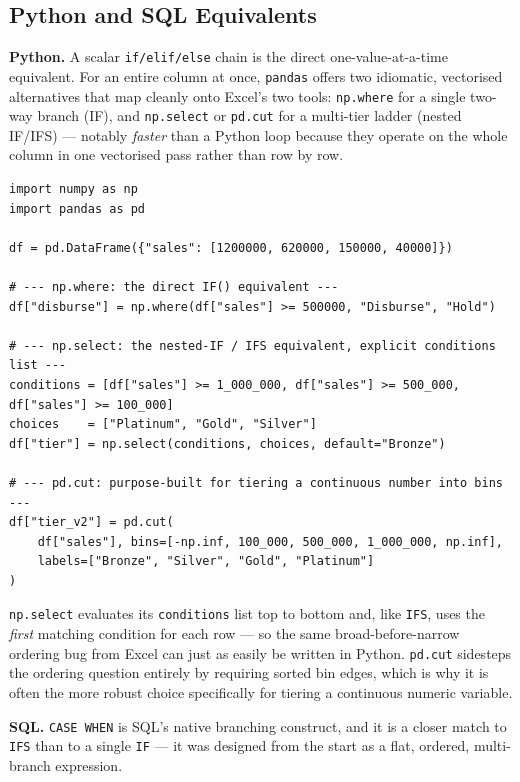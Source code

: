 \documentclass[11pt,a4paper]{article}
\begin{document}
\subsection{Python and SQL Equivalents}

\textbf{Python.} A scalar \texttt{if/elif/else} chain is the direct one-value-at-a-time equivalent. For an entire column at once, \texttt{pandas} offers two idiomatic, vectorised alternatives that map cleanly onto Excel's two tools: \texttt{np.where} for a single two-way branch (IF), and \texttt{np.select} or \texttt{pd.cut} for a multi-tier ladder (nested IF/IFS) --- notably \emph{faster} than a Python loop because they operate on the whole column in one vectorised pass rather than row by row.

\begin{lstlisting}[style=pythonstyle, caption={IF and the tiered bonus schedule, three Python ways}]
import numpy as np
import pandas as pd

df = pd.DataFrame({"sales": [1200000, 620000, 150000, 40000]})

# --- np.where: the direct IF() equivalent ---
df["disburse"] = np.where(df["sales"] >= 500000, "Disburse", "Hold")

# --- np.select: the nested-IF / IFS equivalent, explicit conditions list ---
conditions = [df["sales"] >= 1_000_000, df["sales"] >= 500_000, df["sales"] >= 100_000]
choices    = ["Platinum", "Gold", "Silver"]
df["tier"] = np.select(conditions, choices, default="Bronze")

# --- pd.cut: purpose-built for tiering a continuous number into bins ---
df["tier_v2"] = pd.cut(
    df["sales"], bins=[-np.inf, 100_000, 500_000, 1_000_000, np.inf],
    labels=["Bronze", "Silver", "Gold", "Platinum"]
)
\end{lstlisting}

\begin{protip}
\texttt{np.select} evaluates its \texttt{conditions} list top to bottom and, like \texttt{IFS}, uses the \emph{first} matching condition for each row --- so the same broad-before-narrow ordering bug from Excel can just as easily be written in Python. \texttt{pd.cut} sidesteps the ordering question entirely by requiring sorted bin edges, which is why it is often the more robust choice specifically for tiering a continuous numeric variable.
\end{protip}

\textbf{SQL.} \texttt{CASE WHEN} is SQL's native branching construct, and it is a closer match to \texttt{IFS} than to a single \texttt{IF} --- it was designed from the start as a flat, ordered, multi-branch expression.
\end{document}

